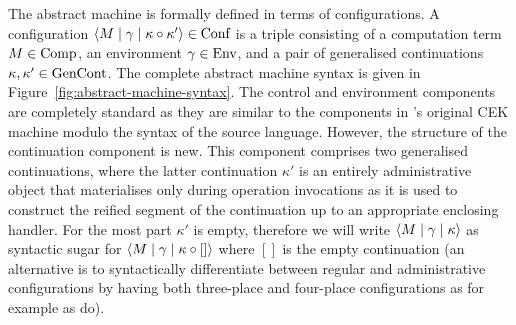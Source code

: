\documentclass[12pt,phd,lfcs,twoside,openright,logo,leftchapter,normalheadings]{infthesis}
\theoremstyle{plain}
\theoremstyle{definition}
\begin{document}
The abstract machine is formally defined in terms of configurations. A
configuration $\langle M \mid \gamma \mid \kappa \circ \kappa' \rangle \in \textrm{Conf}$
is a triple consisting of a computation term $M \in \textrm{Comp}$, an
environment $\gamma \in \textrm{Env}$, and a pair of generalised
continuations $\kappa,\kappa' \in \textrm{GenCont}$.
%
The complete abstract machine syntax is given in
Figure~\ref{fig:abstract-machine-syntax}.
%
The control and environment components are completely standard as they
are similar to the components in \citeauthor{FelleisenF86}'s original
CEK machine modulo the syntax of the source language.
%
However, the structure of the continuation component is new. This
component comprises two generalised continuations, where the latter
continuation $\kappa'$ is an entirely administrative object that
materialises only during operation invocations as it is used to
construct the reified segment of the continuation up to an appropriate
enclosing handler. For the most part $\kappa'$ is empty, therefore we
will write $\langle M \mid \gamma \mid \kappa \rangle$ as syntactic sugar for
$\langle M \mid \gamma \mid \kappa \circ [] \rangle$ where $[]$ is the empty
continuation (an alternative is to syntactically differentiate between
regular and administrative configurations by having both three-place
and four-place configurations as for example as \citet{BiernackaBD03}
do).
%
\end{document}
